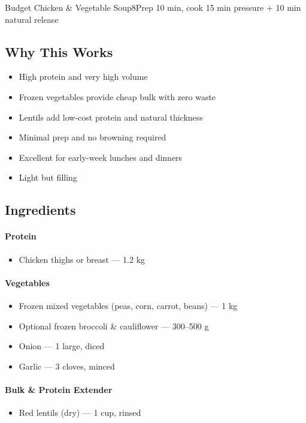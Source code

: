 \begin{recipebox}{Budget Chicken \& Vegetable Soup}{8}{Prep 10 min, cook 15 min pressure + 10 min natural release}
\subsection*{Why This Works}
\begin{itemize}
    \item High protein and very high volume
    \item Frozen vegetables provide cheap bulk with zero waste
    \item Lentils add low-cost protein and natural thickness
    \item Minimal prep and no browning required
    \item Excellent for early-week lunches and dinners
    \item Light but filling
\end{itemize}

\subsection*{Ingredients}

\paragraph{Protein}
\begin{itemize}
    \item Chicken thighs or breast — 1.2 kg
\end{itemize}

\paragraph{Vegetables}
\begin{itemize}
    \item Frozen mixed vegetables (peas, corn, carrot, beans) — 1 kg
    \item Optional frozen broccoli \& cauliflower — 300--500 g
    \item Onion — 1 large, diced
    \item Garlic — 3 cloves, minced
\end{itemize}

\paragraph{Bulk \& Protein Extender}
\begin{itemize}
    \item Red lentils (dry) — 1 cup, rinsed
\end{itemize}


\end{recipebox}
